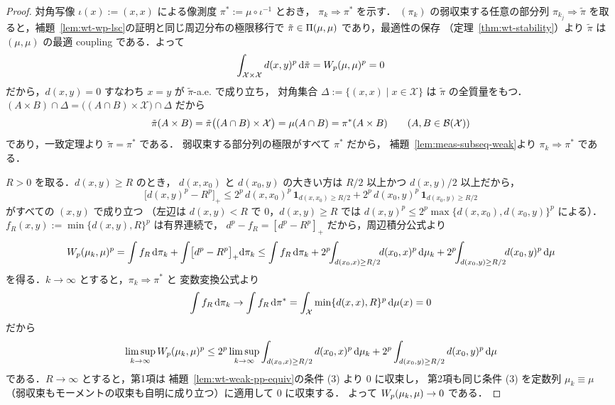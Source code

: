 \begin{proof}
  対角写像 $\iota(x):=(x,x)$ による像測度
  $\pi^*:=\mu\circ\iota^{-1}$ とおき，
  $\pi_k\Rightarrow\pi^*$ を示す．
  $(\pi_k)$ の弱収束する任意の部分列 $\pi_{k_j}\Rightarrow\tilde\pi$
  を取ると，補題~\ref{lem:wt-wp-lsc}の証明と同じ周辺分布の極限移行で
  $\tilde\pi\in\Pi(\mu,\mu)$ であり，最適性の保存
  （定理~\ref{thm:wt-stability}）より $\tilde\pi$ は
  $(\mu,\mu)$ の最適 coupling である．よって
  \[
    \int_{\mathcal{X}\times\mathcal{X}}d(x,y)^p\,\mathrm{d}\tilde\pi
    =W_p(\mu,\mu)^p=0
  \]
  だから，$d(x,y)=0$ すなわち $x=y$ が $\tilde\pi$-a.e. で成り立ち，
  対角集合 $\Delta:=\{(x,x)\mid x\in\mathcal{X}\}$ は
  $\tilde\pi$ の全質量をもつ．
  $(A\times B)\cap\Delta=\bigl((A\cap B)\times\mathcal{X}\bigr)\cap\Delta$
  だから
  \[
    \tilde\pi(A\times B)
    =\tilde\pi\bigl((A\cap B)\times\mathcal{X}\bigr)
    =\mu(A\cap B)
    =\pi^*(A\times B)
    \qquad(A,B\in\mathcal{B}(\mathcal{X}))
  \]
  であり，一致定理より $\tilde\pi=\pi^*$ である．
  弱収束する部分列の極限がすべて $\pi^*$ だから，
  補題~\ref{lem:meas-subseq-weak}より
  $\pi_k\Rightarrow\pi^*$ である．

  $R>0$ を取る．$d(x,y)\geq R$ のとき，
  $d(x,x_0)$ と $d(x_0,y)$ の大きい方は $R/2$ 以上かつ
  $d(x,y)/2$ 以上だから，
  \[
    \bigl[d(x,y)^p-R^p\bigr]_+
    \leq2^p\,d(x,x_0)^p\,\mathbf{1}_{d(x,x_0)\geq R/2}
    +2^p\,d(x_0,y)^p\,\mathbf{1}_{d(x_0,y)\geq R/2}
  \]
  がすべての $(x,y)$ で成り立つ
  （左辺は $d(x,y)<R$ で $0$，$d(x,y)\geq R$ では
  $d(x,y)^p\leq2^p\max\{d(x,x_0),d(x_0,y)\}^p$ による）．
  $f_R(x,y):=\min\{d(x,y),R\}^p$ は有界連続で，
  $d^p-f_R=[d^p-R^p]_+$ だから，周辺積分公式より
  \[
    \Wass_p(\mu_k,\mu)^p
    =\int f_R\,\d\pi_k
    +\int\bigl[d^p-R^p\bigr]_+\d\pi_k
    \leq\int f_R\,\d\pi_k
    +2^p\!\!\int_{d(x_0,x)\geq R/2}\!\!d(x_0,x)^p\,\d\mu_k
    +2^p\!\!\int_{d(x_0,y)\geq R/2}\!\!d(x_0,y)^p\,\d\mu
  \]
  を得る．$k\to\infty$ とすると，$\pi_k\Rightarrow\pi^*$ と
  変数変換公式より
  \[
    \int f_R\,\mathrm{d}\pi_k
    \to\int f_R\,\mathrm{d}\pi^*
    =\int_{\mathcal{X}}\min\{d(x,x),R\}^p\,\mathrm{d}\mu(x)
    =0
  \]
  だから
  \[
    \limsup_{k\to\infty}W_p(\mu_k,\mu)^p
    \leq2^p\limsup_{k\to\infty}
    \int_{d(x_0,x)\geq R/2}d(x_0,x)^p\,\mathrm{d}\mu_k
    +2^p\int_{d(x_0,y)\geq R/2}d(x_0,y)^p\,\mathrm{d}\mu
  \]
  である．$R\to\infty$ とすると，第1項は
  補題~\ref{lem:wt-weak-pp-equiv}の条件 (3) より $0$ に収束し，
  第2項も同じ条件 (3) を定数列 $\mu_k\equiv\mu$
  （弱収束もモーメントの収束も自明に成り立つ）に適用して
  $0$ に収束する．
  よって $W_p(\mu_k,\mu)\to0$ である．
\end{proof}

